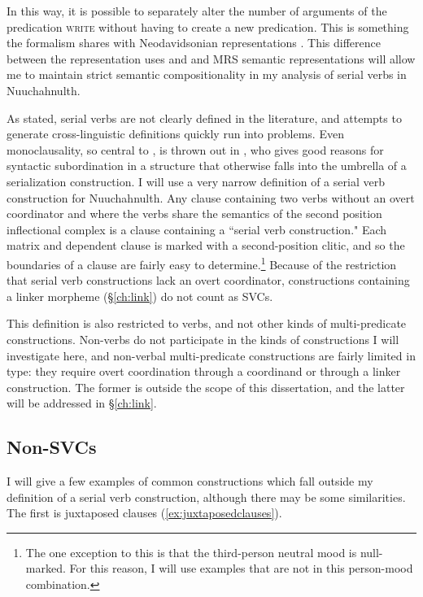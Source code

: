 In this way, it is possible to separately alter the number of arguments of the predication \textsc{write} without having to create a new predication. This is something the formalism shares with Neodavidsonian representations \citep{parsons1990}. This difference between the representation \citeauthor{butt1995} uses and and MRS semantic representations will allow me to maintain strict semantic compositionality in my analysis of serial verbs in Nuuchahnulth.

As stated, serial verbs are not clearly defined in the literature, and attempts to generate cross-linguistic definitions quickly run into problems. Even monoclausality, so central to \cite{aikhenvalddixon2006}, is thrown out in \cite{butt1995}, who gives good reasons for syntactic subordination in a structure that otherwise falls into the umbrella of a serialization construction. I will use a very narrow definition of a serial verb construction for Nuuchahnulth. Any clause containing two verbs without an overt coordinator and where the verbs share the semantics of the second position inflectional complex is a clause containing a ``serial verb construction." Each matrix and dependent clause is marked with a second-position clitic, and so the boundaries of a clause are fairly easy to determine.\footnote{The one exception to this is that the third-person neutral mood is null-marked. For this reason, I will use examples that are not in this person-mood combination.} Because of the restriction that serial verb constructions lack an overt coordinator, constructions containing a linker morpheme (\S\ref{ch:link}) do not count as SVCs.

This definition is also restricted to verbs, and not other kinds of multi-predicate constructions. Non-verbs do not participate in the kinds of constructions I will investigate here, and non-verbal multi-predicate constructions are fairly limited in type: they require overt coordination through a coordinand or through a linker construction. The former is outside the scope of this dissertation, and the latter will be addressed in \S\ref{ch:link}.

\subsection{Non-SVCs}

I will give a few examples of common constructions which fall outside my definition of a serial verb construction, although there may be some similarities. The first is juxtaposed clauses (\ref{ex:juxtaposedclauses}).

